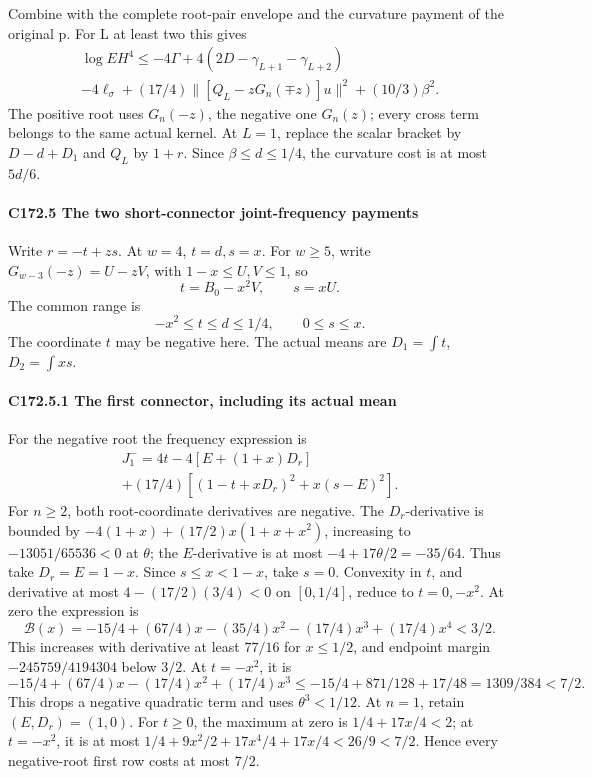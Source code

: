 Combine with the complete root-pair envelope and the curvature payment of the original p. For L at least two this gives
\[
\begin{gathered}
\log EH^4\le-4\Gamma+4(2D-\gamma_{L+1}-\gamma_{L+2})\\
-4\ell_\sigma+(17/4)\|[Q_L-zG_n(\mp z)]u\|^2+(10/3)\beta^2.
\end{gathered}\tag{C172.T179.23}
\]
The positive root uses \(G_n(-z)\), the negative one \(G_n(z)\); every cross term belongs to the same actual kernel. At \(L=1\), replace the scalar bracket by \(D-d+D_1\) and \(Q_L\) by \(1+r\). Since \(\beta\le d\le1/4\), the curvature cost is at most \(5d/6\).

\paragraph{C172.5 The two short-connector joint-frequency payments}

Write \(r=-t+zs\). At \(w=4\), \(t=d,\allowbreak \allowbreak  s=x\). For \(w\ge5\), write \(G_{w-3}(-z)=U-zV\), with \(1-x\le U,\allowbreak \allowbreak  V\le1\), so
\[
t=B_0-x^2V,\qquad s=xU.
\]
The common range is
\[
-x^2\le t\le d\le1/4,\qquad0\le s\le x.                \tag{C172.T179.24}
\]
The coordinate \(t\) may be negative here. The actual means are \(D_1=\int t\), \(D_2=\int xs\).

\paragraph{C172.5.1 The first connector, including its actual mean}

For the negative root the frequency expression is
\[
\begin{gathered}
J_1^-=4t-4[E+(1+x)D_r]\\
+(17/4)[(1-t+xD_r)^2+x(s-E)^2].
\end{gathered}\tag{C172.T179.25}
\]
For \(n\ge2\), both root-coordinate derivatives are negative. The \(D_r\)-derivative is bounded by \(-4(1+x)+(17/2)x(1+x+x^2)\), increasing to \(-13051/65536<0\) at \(\theta\); the \(E\)-derivative is at most \(-4+17\theta/2=-35/64\). Thus take \(D_r=E=1-x\). Since \(s\le x<1-x\), take \(s=0\). Convexity in \(t\), and derivative at most \(4-(17/2)(3/4)<0\) on \([0,\allowbreak \allowbreak  1/4]\), reduce to \(t=0,\allowbreak \allowbreak -x^2\). At zero the expression is
\[
\mathcal B(x)=-15/4+(67/4)x-(35/4)x^2-(17/4)x^3+(17/4)x^4<3/2.
\]
This increases with derivative at least \(77/16\) for \(x\le1/2\), and endpoint margin \(-245759/4194304\) below \(3/2\). At \(t=-x^2\), it is
\[
-15/4+(67/4)x-(17/4)x^2+(17/4)x^3
\le-15/4+871/128+17/48=1309/384<7/2.
\]
This drops a negative quadratic term and uses \(\theta^3<1/12\). At \(n=1\), retain \((E,\allowbreak \allowbreak  D_r)=(1,\allowbreak \allowbreak  0)\). For \(t\ge0\), the maximum at zero is \(1/4+17x/4<2\); at \(t=-x^2\), it is at most \(1/4+9x^2/2+17x^4/4+17x/4<26/9<7/2\). Hence every negative-root first row costs at most \(7/2\).

